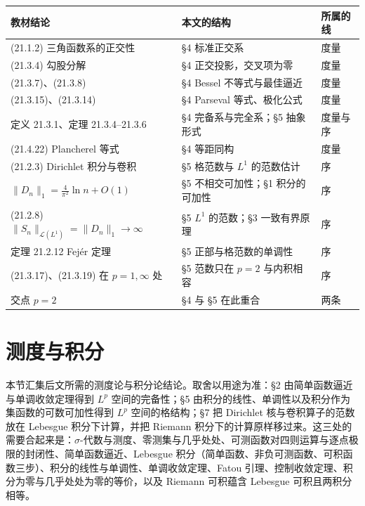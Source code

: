 \documentclass[oneside]{book}
\theoremstyle{definition}
\theoremstyle{definition}
\begin{document}
	\begin{link}
		\small
		\setlength{\tabcolsep}{4pt}
		\renewcommand{\arraystretch}{1.2}
		\begin{tabular}{@{}p{5.4cm}p{6.5cm}p{2.0cm}@{}}
			\toprule
			教材结论 & 本文的结构 & 所属的线\\
			\midrule
			(21.1.2) 三角函数系的正交性 & \S 4 标准正交系 & 度量\\
			(21.3.4) 勾股分解 & \S 4 正交投影，交叉项为零 & 度量\\
			(21.3.7)、(21.3.8) & \S 4 Bessel 不等式与最佳逼近 & 度量\\
			(21.3.15)、(21.3.14) & \S 4 Parseval 等式、极化公式 & 度量\\
			定义 21.3.1、定理 21.3.4--21.3.6 & \S 4 完备系与完全系；\S 5 抽象形式 & 度量与序\\
			(21.4.22) Plancherel 等式 & \S 4 等距同构 & 度量\\
			(21.2.3) Dirichlet 积分与卷积 & \S 5 格范数与 $L^{1}$ 的范数估计 & 序\\
			$\|D_{n}\|_{1}=\frac{4}{\pi^{2}}\ln n+O(1)$ & \S 5 不相交可加性；\S 1 积分的可加性 & 序\\
			(21.2.8) $\|S_{n}\|_{\mathcal{L}(L^{1})}=\|D_{n}\|_{1}\to\infty$ & \S 5 $L^{1}$ 的范数；\S 3 一致有界原理 & 序\\
			定理 21.2.12 Fej\'er 定理 & \S 5 正部与格范数的单调性 & 序\\
			(21.3.17)、(21.3.19) 在 $p=1,\infty$ 处 & \S 5 范数只在 $p=2$ 与内积相容 & 序\\
			交点 $p=2$ & \S 4 与 \S 5 在此重合 & 两条\\
			\bottomrule
		\end{tabular}
	\end{link}
	
	\chapter{测度与积分}
	
	本节汇集后文所需的测度论与积分论结论。取舍以用途为准：\S2 由简单函数逼近与单调收敛定理得到 $L^{p}$ 空间的完备性；\S5 由积分的线性、单调性以及积分作为集函数的可数可加性得到 $L^{p}$ 空间的格结构；\S7 把 Dirichlet 核与卷积算子的范数放在 Lebesgue 积分下计算，并把 Riemann 积分下的计算原样移过来。这三处的需要合起来是：$\sigma$-代数与测度、零测集与几乎处处、可测函数对四则运算与逐点极限的封闭性、简单函数逼近、Lebesgue 积分（简单函数、非负可测函数、可积函数三步）、积分的线性与单调性、单调收敛定理、Fatou 引理、控制收敛定理、积分为零与几乎处处为零的等价，以及 Riemann 可积蕴含 Lebesgue 可积且两积分相等。
	
\end{document}
